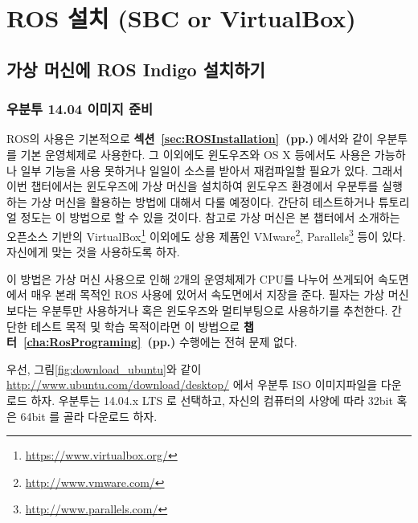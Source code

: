 
\chapter{ROS 설치 (SBC or VirtualBox)}\label{cha:ros_install_sbc}

\section{가상 머신에 ROS Indigo 설치하기}

\subsection{우분투 14.04 이미지 준비}

ROS의 사용은 기본적으로 \textbf{섹션~\ref{sec:ROSInstallation}~(pp.\pageref{sec:ROSInstallation})} 에서와 같이 우분투를 기본 운영체제로 사용한다. 그 이외에도 윈도우즈와 OS X 등에서도 사용은 가능하나 일부 기능을 사용 못하거나 일일이 소스를 받아서 재컴파일할 필요가 있다. 그래서 이번 챕터에서는 윈도우즈에 가상 머신을 설치하여 윈도우즈 환경에서 우분투를 실행하는 가상 머신을 활용하는 방법에 대해서 다룰 예정이다. 간단히 테스트하거나 튜토리얼 정도는 이 방법으로 할 수 있을 것이다. 참고로 가상 머신은 본 챕터에서 소개하는 오픈소스 기반의 VirtualBox\footnote{\url{https://www.virtualbox.org/}} 이외에도 상용 제품인 VMware\footnote{\url{http://www.vmware.com/}}, Parallels\footnote{\url{http://www.parallels.com/}} 등이 있다. 자신에게 맞는 것을 사용하도록 하자.

이 방법은 가상 머신 사용으로 인해 2개의 운영체제가 CPU를 나누어 쓰게되어 속도면에서 매우 본래 목적인 ROS 사용에 있어서 속도면에서 지장을 준다. 필자는 가상 머신보다는 우분투만 사용하거나 혹은 윈도우즈와 멀티부팅으로 사용하기를 추천한다. 간단한 테스트 목적 및 학습 목적이라면 이 방법으로 \textbf{챕터~\ref{cha:RosPrograming}~(pp.\pageref{cha:RosPrograming})} 수행에는 전혀 문제 없다.

우선, 그림\ref{fig:download_ubuntu}와 같이 \url{http://www.ubuntu.com/download/desktop/} 에서 우분투 ISO 이미지파일을 다운로드 하자. 우분투는 14.04.x LTS 로 선택하고, 자신의 컴퓨터의 사양에 따라 32bit 혹은 64bit 를 골라 다운로드 하자.

